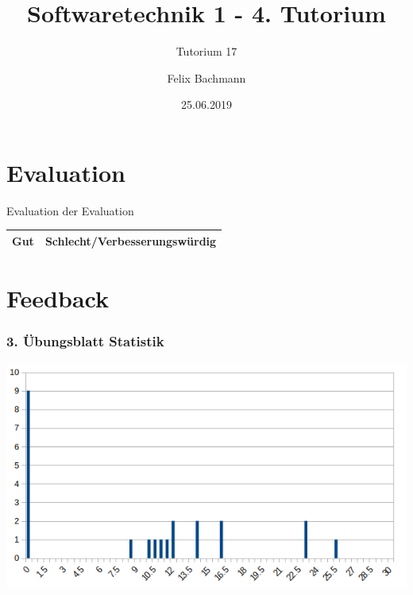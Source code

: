 \documentclass[18pt]{beamer}
\title[SWT1]{Softwaretechnik 1 - 4. Tutorium}
\subtitle{Tutorium 17}
\author{Felix Bachmann}
\date{25.06.2019}
\institute{KIT - Institut für Programmstrukturen und Datenorganisation (IPD)}
\begin{document}

\begin{frame}
\titlepage
\end{frame}

\section{Evaluation}
	\begin{frame}{Evaluation der Evaluation}
	\centering
		\begin{tabular}{|c|c|}
			\hline 
			Gut & Schlecht/Verbesserungswürdig \\ 
			\hline
			\hline 
		\end{tabular} 
	\end{frame}

\section{Feedback}
	\begin{frame}
	\frametitle{3. Übungsblatt Statistik}
	\includegraphics[scale=0.7]{./pics/tut3/statistics-ub3.png}
\end{frame}
\end{document}
